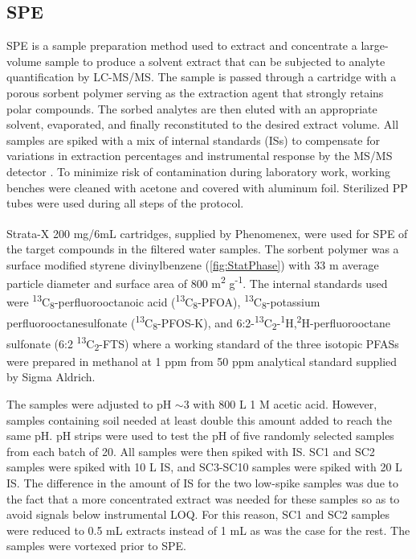 \subsection{SPE}
SPE is a sample preparation method used to extract and concentrate a large-volume sample to produce a solvent extract that can be subjected to analyte quantification by LC-MS/MS. The sample is passed through a cartridge with a porous sorbent polymer serving as the extraction agent that strongly retains polar compounds. The sorbed analytes are then eluted with an appropriate solvent, evaporated, and finally reconstituted to the desired extract volume. All samples are spiked with a mix of internal standards (\acrshort{IS}s) to compensate for variations in extraction percentages and instrumental response by the MS/MS detector \citep{arvaniti2014}. To minimize risk of contamination during laboratory work, working benches were cleaned with acetone and covered with aluminum foil. Sterilized PP tubes were used during all steps of the protocol.

Strata-X\textsuperscript{\textregistered} 200 mg/6mL cartridges, supplied by Phenomenex, were used for \acrshort{SPE} of the target compounds in the filtered water samples. The sorbent polymer was a surface modified styrene divinylbenzene (\cref{fig:StatPhase}) with 33 \textmu m average particle diameter and surface area of 800 m\textsuperscript{2} g\textsuperscript{-1}. The internal standards used were \textsuperscript{13}C\textsubscript{8}-perfluorooctanoic acid  (\textsuperscript{13}C\textsubscript{8}-PFOA), \textsuperscript{13}C\textsubscript{8}-potassium perfluorooctanesulfonate (\textsuperscript{13}C\textsubscript{8}-PFOS-K), and 6:2-\textsuperscript{13}C\textsubscript{2}-\textsuperscript{1}H,\textsuperscript{2}H-perfluorooctane sulfonate  (6:2 \textsuperscript{13}C\textsubscript{2}-FTS) where a working standard of the three isotopic PFASs were prepared in methanol at 1 ppm from 50 ppm analytical standard supplied by Sigma Aldrich.

The samples were adjusted to pH $\sim$3 with 800 \textmu L 1 M acetic acid. However, samples containing soil needed at least double this amount added to reach the same pH. pH strips were used to test the pH of five randomly selected samples from each batch of 20. All samples were then spiked with IS. SC1 and SC2 samples were spiked with 10 \textmu L IS, and SC3-SC10 samples were spiked with 20 \textmu L IS. The difference in the amount of IS for the two low-spike samples was due to the fact that a more concentrated extract was needed for these samples  so as to avoid signals below instrumental \acrshort{LOQ}.  For this reason, SC1 and SC2 samples were reduced to 0.5 mL extracts instead of 1 mL as was the case for the rest. The samples were vortexed prior to SPE.

